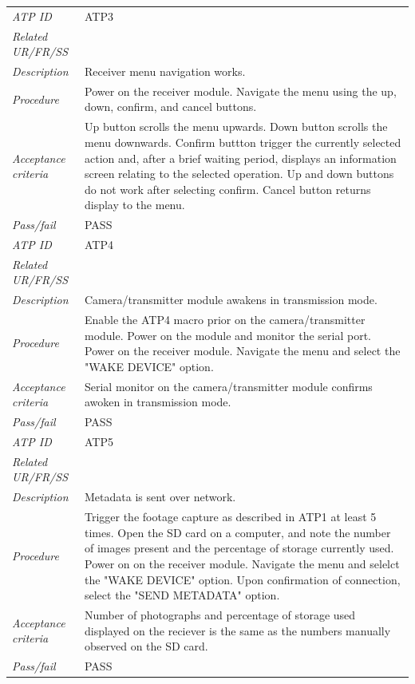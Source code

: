 \begin{table}[!ht]
\begin{scriptsize}
\begin{tabularx}{\textwidth}{|p{} X|}
        \textit{ATP ID} & ATP3\\
        \textit{Related UR/FR/SS} &\\
        \textit{Description} & Receiver menu navigation works.\\
        \textit{Procedure} & Power on the receiver module. Navigate the menu using the up, down, confirm, and cancel buttons.\\
        \textit{Acceptance criteria} & Up button scrolls the menu upwards. Down button scrolls the menu downwards. Confirm buttton trigger the currently selected action and, after a brief waiting period, displays an information screen relating to the selected operation. Up and down buttons do not work after selecting confirm. Cancel button returns display to the menu.\\ 
        \textit{Pass/fail} & PASS \\ \hline

        \textit{ATP ID} & ATP4 \\
        \textit{Related UR/FR/SS} & \\
        \textit{Description} & Camera/transmitter module awakens in transmission mode. \\
        \textit{Procedure} &  Enable the ATP4 macro prior on the camera/transmitter module. Power on the module and monitor the serial port. Power on the receiver module. Navigate the menu and select the "WAKE DEVICE" option.\\
        \textit{Acceptance criteria} & Serial monitor on the camera/transmitter module confirms awoken in transmission mode.\\ 
        \textit{Pass/fail} & PASS\\ \hline

        \textit{ATP ID} & ATP5  \\
        \textit{Related UR/FR/SS} &\\
        \textit{Description} & Metadata is sent over network.\\
        \textit{Procedure} & Trigger the footage capture as described in ATP1 at least 5 times. Open the SD card on a computer, and note the number of images present and the percentage of storage currently used. Power on on the receiver module. Navigate the menu and selelct the "WAKE DEVICE" option. Upon confirmation of connection, select the "SEND METADATA" option.\\
        \textit{Acceptance criteria} & Number of photographs and percentage of storage used displayed on the reciever is the same as the numbers manually observed on the SD card. \\ 
        \textit{Pass/fail} & PASS\\ \hline


\end{tabularx}
\end{scriptsize}
\end{table}
